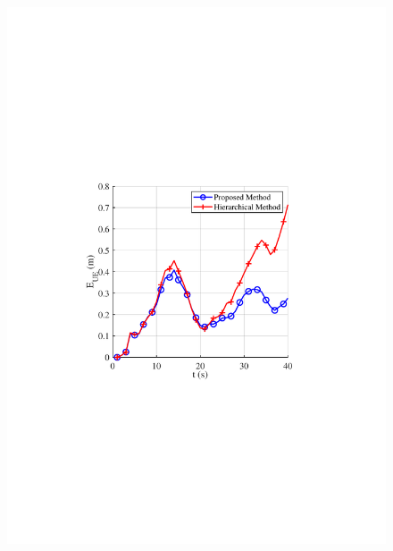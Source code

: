 \documentclass[journal,12pt,onecolumn,draftclsnofoot,]{IEEEtran}
\begin{document}
\begin{figure}
{\hspace{-0mm}\includegraphics[scale=0.46]{8-4.pdf}\hspace{-0mm}
}
\quad
\subfloat[]{
}
\end{figure}
\end{document}
